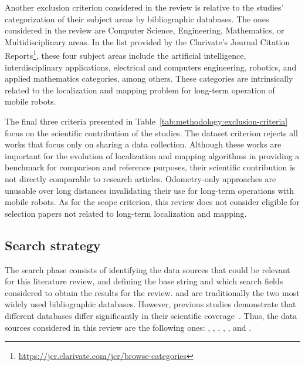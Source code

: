 Another exclusion criterion considered in the review is relative to the studies' categorization of their subject areas by bibliographic databases. The ones considered in the review are Computer Science, Engineering, Mathematics, or Multidisciplinary areas. In the list provided by the Clarivate's Journal Citation Reports\footnote{\url{https://jcr.clarivate.com/jcr/browse-categories}}, these four subject areas include the artificial intelligence, interdisciplinary applications, electrical and computers engineering, robotics, and applied mathematics categories, among others. These categories are intrinsically related to the localization and mapping problem for long-term operation of mobile robots.

The final three criteria presented in Table~\ref{tab:methodology:exclusion-criteria} focus on the scientific contribution of the studies. The dataset criterion rejects all works that focus only on sharing a data collection. Although these works are important for the evolution of localization and mapping algorithms in providing a benchmark for comparison and reference purposes, their scientific contribution is not directly comparable to research articles. Odometry-only approaches are unusable over long distances invalidating their use for long-term operations with mobile robots. As for the scope criterion, this review does not consider eligible for selection papers not related to long-term localization and mapping.

\subsection{Search strategy}
\label{sec:methodology:search}

The search phase consists of identifying the data sources that could be relevant for this literature review, and defining the base string and which search fields considered to obtain the results for the review.  and  are traditionally the two most widely used bibliographic databases. However, previous studies demonstrate that different databases differ significantly in their scientific coverage~\parencite{methodology:search:db:coverage:scopus-wos,methodology:search:db:coverage:dim-scopus-wos}. Thus, the data sources considered in this review are the following ones: , , , , , and .


